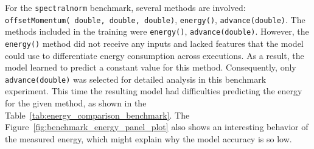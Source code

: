 {\color{blue}For the \texttt{spectralnorm} benchmark, several methods are involved: \texttt{offsetMomentum(\allowbreak\ double,\allowbreak\ double,\allowbreak\ double)},
\texttt{energy()}, \texttt{advance(double)}. The methods included in the training were \texttt{energy()}, \texttt{advance(double)}. However, the \texttt{energy()} method did not receive any inputs and lacked features that the model could use to differentiate energy consumption across executions. As a result, the model learned to predict a constant value for this method. Consequently, only \texttt{advance(double)} was selected for detailed analysis in this benchmark experiment.}
This time the resulting model had difficulties predicting the energy for the given method, as shown in the Table~\ref{tab:energy_comparison_benchmark}. The Figure~\ref{fig:benchmark_energy_panel_plot} also shows an interesting behavior of the measured energy, which might explain why the model accuracy is so low.


\begin{table}[htbp]
  \centering
  \footnotesize
  \setlength{\tabcolsep}{10pt} 
  \caption{Comparison of actual and predicted energy consumption for nBody, fannkuch and spectralnorm program}
  \label{tab:energy_comparison_benchmark}
\end{table}


